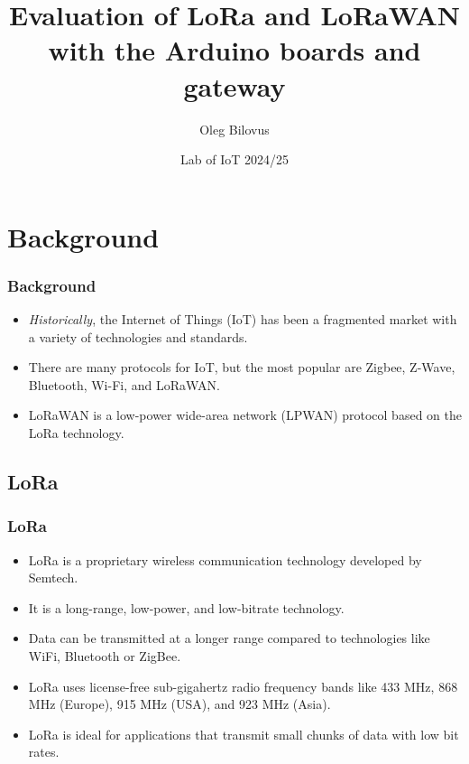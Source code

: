 \documentclass{beamer}
\title[LoRaWAN]{Evaluation of LoRa and LoRaWAN with the Arduino boards and gateway}
\author{Oleg Bilovus}
\institute{Università degli Studi di Salerno}
\date[Lab of IoT 24/25]{Lab of IoT 2024/25}
\begin{document}
\begin{frame}
    \titlepage{}
\end{frame}

\section{Background}
\begin{frame}
    \frametitle{Background}
    \begin{itemize}[<+->]
        \item \emph{Historically}, the Internet of Things (IoT) has been a fragmented market with a variety of technologies and standards.
        \item There are many protocols for IoT, but the most popular are Zigbee, Z-Wave,
              Bluetooth, Wi-Fi, and LoRaWAN\@.
        \item LoRaWAN is a low-power wide-area network (LPWAN) protocol based on the LoRa
              technology.
    \end{itemize}
\end{frame}

\subsection{LoRa}
\begin{frame}
    \frametitle{LoRa}
    \begin{itemize}[<+->]
        \item LoRa is a proprietary wireless communication technology developed by Semtech.
        \item It is a long-range, low-power, and low-bitrate technology.
        \item Data can be transmitted at a longer range compared to technologies like WiFi,
              Bluetooth or ZigBee.
        \item LoRa uses license-free sub-gigahertz radio frequency bands like 433 MHz, 868
              MHz (Europe), 915 MHz (USA), and 923 MHz (Asia).
        \item LoRa is ideal for applications that transmit small chunks of data with low bit
              rates.
    \end{itemize}
\end{frame}
\end{document}
